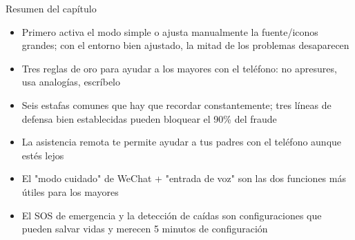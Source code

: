 \begin{tcbsummary}{Resumen del capítulo}
\begin{itemize}
  \item Primero activa el modo simple o ajusta manualmente la fuente/iconos grandes; con el entorno bien ajustado, la mitad de los problemas desaparecen
  \item Tres reglas de oro para ayudar a los mayores con el teléfono: no apresures, usa analogías, escríbelo
  \item Seis estafas comunes que hay que recordar constantemente; tres líneas de defensa bien establecidas pueden bloquear el 90\% del fraude
  \item La asistencia remota te permite ayudar a tus padres con el teléfono aunque estés lejos
  \item El "modo cuidado" de WeChat + "entrada de voz" son las dos funciones más útiles para los mayores
  \item El SOS de emergencia y la detección de caídas son configuraciones que pueden salvar vidas y merecen 5 minutos de configuración
\end{itemize}

\end{tcbsummary}
